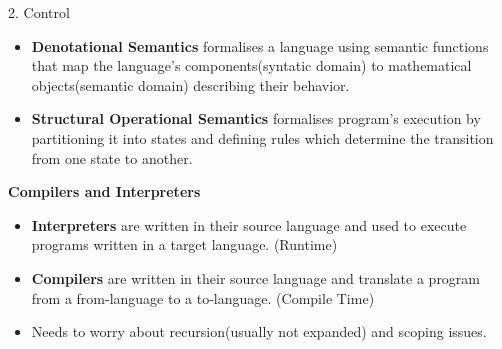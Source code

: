 \graphicspath{ {./images/} } %
\begin{center}
     \Large{2. Control}
\end{center}
\begin{itemize}
    \item \textbf{Denotational Semantics} formalises a language using semantic functions that map the language's components(syntatic domain) to mathematical objects(semantic domain) describing their behavior. 
    \item \textbf{Structural Operational Semantics} formalises program's execution by partitioning it into states and defining rules which determine the transition from one state to another. 
\end{itemize}

\begin{center}
     \textbf{Compilers and Interpreters}
\end{center}
\begin{itemize}
    \item \textbf{Interpreters} are written in their source language and used to execute programs written in a target language. (Runtime)
    \item \textbf{Compilers} are written in their source language and translate a program from a from-language to a to-language. (Compile Time)
    \item Needs to worry about recursion(usually not expanded) and scoping issues.
\end{itemize}
